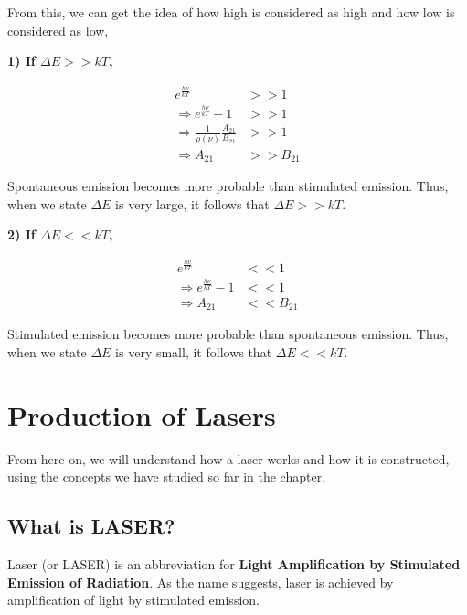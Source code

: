 \documentclass[12pt]{article}
\begin{document}
From this, we can get the idea of how high is considered as high and how low is considered as low,
\begin{block}
    \textbf{1) If $\Delta E >> kT$,}

    \begin{block}[left=1cm, top=-.5cm]
        \begin{align*}
            e^{\frac{h\nu}{kT}} & >> 1 \\
            \Rightarrow e^{\frac{h\nu}{kT}} - 1 & >> 1 \\
            \Rightarrow \frac{1}{\rho(\nu)} \frac{A_{21}}{B_{21}} & >> 1 \\
            \Rightarrow A_{21} & >> B_{21}
        \end{align*}

        Spontaneous emission becomes more probable than stimulated emission. Thus, when we state $\Delta E$ is very large, it follows that $\Delta E >> kT$. 
    \end{block}

    \textbf{2) If $\Delta E << kT$,}

    \begin{block}[left=1cm, top=-.5cm]
        \begin{align*}
            e^{\frac{h\nu}{kT}} & << 1 \\
            \Rightarrow e^{\frac{h\nu}{kT}} - 1 & << 1 \\
            \Rightarrow A_{21} & << B_{21}
        \end{align*}
    
        Stimulated emission becomes more probable than spontaneous emission. Thus, when we state $\Delta E$ is very small, it follows that $\Delta E << kT$. 
    \end{block}
\end{block}

\section{Production of Lasers}

From here on, we will understand how a laser works and how it is constructed, using the concepts we have studied so far in the chapter.

\subsection{What is LASER?}

Laser (or LASER) is an abbreviation for \textbf{Light Amplification by Stimulated Emission of Radiation}. As the name suggests, laser is achieved by amplification of light by stimulated emission. \vspace{.2cm}
\end{document}
